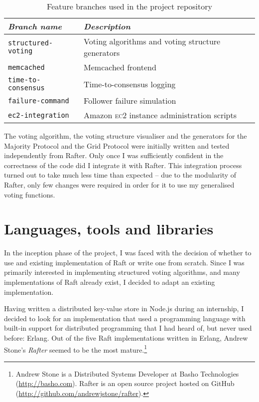 \documentclass[11pt,chapterprefix=true,toc=bibliography,numbers=noendperiod,
               footnotes=multiple,twoside]{scrreprt}
\newcommand{\ECC}[0]{\textsc{ec}2 }
\begin{document}
\begin{table}[h]
    \centering
    \begin{tabularx}{\textwidth}{l X}
        \toprule
        \textit{Branch name} & \textit{Description} \\
        \midrule
        \texttt{structured-voting} & Voting algorithms and voting structure generators \\
        \texttt{memcached} & Memcached frontend \\
        \texttt{time-to-consensus} & Time-to-consensus logging \\
        \texttt{failure-command} & Follower failure simulation \\
        \texttt{ec2-integration} & Amazon \ECC instance administration scripts \\
        \bottomrule
    \end{tabularx}
    \caption{Feature branches used in the project repository}
    \label{tab:branches}
\end{table}

The voting algorithm, the voting structure visualiser and the generators for the Majority Protocol and the Grid Protocol were initially written and tested independently from Rafter. Only once I was sufficiently confident in the correctness of the code did I integrate it with Rafter. This integration process turned out to take much less time than expected -- due to the modularity of Rafter, only few changes were required in order for it to use my generalised voting functions.

\section{Languages, tools and libraries\label{sc:tools}}

In the inception phase of the project, I was faced with the decision of whether to use and existing implementation of Raft or write one from scratch. Since I was primarily interested in implementing structured voting algorithms, and many implementations of Raft already exist, I decided to adapt an existing implementation.

Having written a distributed key-value store in Node.js during an internship, I decided to look for an implementation that used a programming language with built-in support for distributed programming that I had heard of, but never used before: Erlang. Out of the five Raft implementations written in Erlang, Andrew Stone's \emph{Rafter} seemed to be the most mature.\footnote{Andrew Stone is a Distributed Systems Developer at Basho Technologies (\url{http://basho.com}). Rafter is an open source project hosted on GitHub (\url{http://github.com/andrewjstone/rafter}).}
\end{document}
